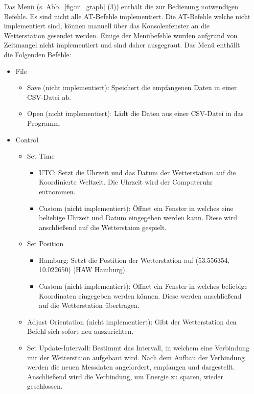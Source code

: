 Das Menü (s. Abb.~\ref{fig:ui_graph} (3)) enthält die zur Bedienung notwendigen Befehle. Es sind nicht alle AT-Befehle implementiert. Die AT-Befehle welche nicht implementiert sind, können manuell über das Konsolenfenster an die Wetterstation gesendet werden. Einige der Menübefehle wurden aufgrund von Zeitmangel nicht implementiert und sind daher ausgegraut. Das Menü enthällt die Folgenden Befehle:
\begin{itemize}
\item File
  \begin{itemize}
  \item Save (nicht implementiert): Speichert die empfangenen Daten in einer CSV-Datei ab.
  \item Open (nicht implementiert): Lädt die Daten aus einer CSV-Datei in das Programm.
  \end{itemize}
\item Control
  \begin{itemize}
  \item Set Time
    \begin{itemize}
    \item UTC: Setzt die Uhrzeit und das Datum der Wetterstation auf die Koordinierte Weltzeit. Die Uhrzeit wird der Computeruhr entnommen.
    \item Custom (nicht implementiert): Öffnet ein Fenster in welches eine beliebige Uhrzeit und Datum eingegeben werden kann. Diese wird anschließend auf die Wetterstaion gespielt.
    \end{itemize}
  \item Set Position
    \begin{itemize}
    \item Hamburg: Setzt die Postition der Wetterstation auf (53.556354, 10.022650) (HAW Hamburg).
    \item Custom (nicht implementiert): Öffnet ein Fenster in welches beliebige Koordinaten eingegeben werden können. Diese werden anschließend auf die Wetterstation übertragen.
    \end{itemize}
  \item Adjust Orientation (nicht implementiert): Gibt der Wetterstation den Befehl sich sofort neu auszurichten.
  \item Set Update-Intervall: Bestimmt das Intervall, in welchem eine Verbindung mit der Wetterstaion aufgebaut wird. Nach dem Aufbau der Verbindung werden die neuen Messdaten angefordert, empfangen und dargestellt. Anschließend wird die Verbindung, um Energie zu sparen, wieder geschlossen.
    \begin{itemize}

\end{itemize}
\end{itemize}
\end{itemize}
